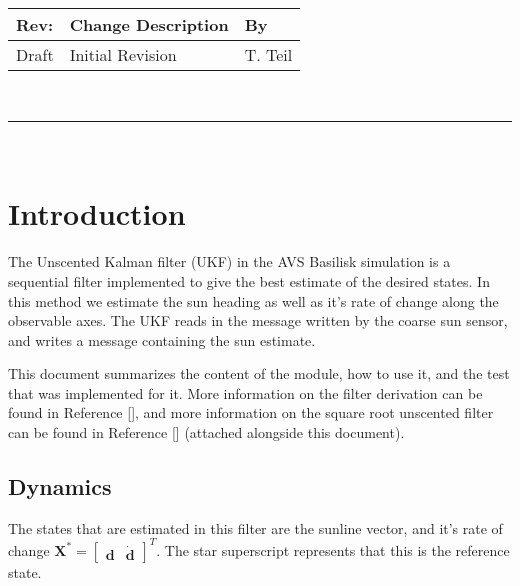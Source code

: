 \documentclass[]{BasiliskReportMemo}
\begin{document}
\makeCover



%
%
\pagestyle{empty}
{\renewcommand{\arraystretch}{2}
\noindent
\begin{longtable}{|p{0.5in}|p{4.5in}|p{1.14in}|}
\hline
{\bfseries Rev}: & {\bfseries Change Description} & {\bfseries By} \\
\hline
Draft & Initial Revision & T. Teil \\
\hline

\end{longtable}
}

\newpage
\setcounter{page}{1}
\pagestyle{fancy}

\tableofcontents
~\\ \hrule ~\\


\section{Introduction}
The Unscented Kalman filter (UKF) in the AVS Basilisk simulation is a sequential
filter implemented to give the best estimate of the desired states.
In this method we estimate the sun heading as well as it's rate of change along the observable axes.
The UKF reads in the message written by the coarse sun sensor, and writes a message 
containing the sun estimate. 

This document summarizes the content of the module, how to use it, and the test that 
was implemented for it. More information on the filter derivation can be found in Reference [], and more information on the square root unscented filter can be found in Reference [] (attached alongside this document).


\subsection{Dynamics}

The states that are estimated in this filter are the sunline vector, and it's rate of change $\bm X^* = \begin{bmatrix} \bm d &  \dot{\bm d}\end{bmatrix}^T$. The star superscript represents that
this is the reference state. 
\end{document}
